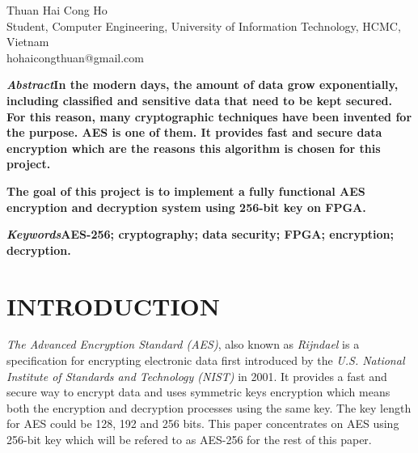 \documentclass[a4paper, 10pt]{article}
\begin{document}
    \title{}
    \author{}
    \maketitle %

    \begin{center}
        Thuan Hai Cong Ho\\
        Student, Computer Engineering, University of Information Technology, HCMC, Vietnam\\
        hohaicongthuan@gmail.com
    \end{center}
    \begin{multicols}{2}
        
        \textbf{\textit{Abstract\textemdash}In the modern days, the amount of data grow exponentially, including classified and sensitive data that need to be kept secured. For this reason, many cryptographic techniques have been invented for the purpose. AES is one of them. It provides fast and secure data encryption which are the reasons this algorithm is chosen for this project.}

        \textbf{The goal of this project is to implement a fully functional AES encryption and decryption system using 256-bit key on FPGA.}
        
        \bigskip

        \textbf{\textit{Keywords\textemdash}AES-256; cryptography; data security; FPGA; encryption; decryption.}

        \section{INTRODUCTION}
            \textit{The Advanced Encryption Standard (AES)}, also known as \textit{Rijndael} is a specification for encrypting electronic data first introduced by the \textit{U.S. National Institute of Standards and Technology (NIST)} in 2001. It provides a fast and secure way to encrypt data and uses symmetric keys encryption which means both the encryption and decryption processes using the same key. The key length for AES could be 128, 192 and 256 bits. This paper concentrates on AES using 256-bit key which will be refered to as AES-256 for the rest of this paper.
            

\end{multicols}
\end{document}
